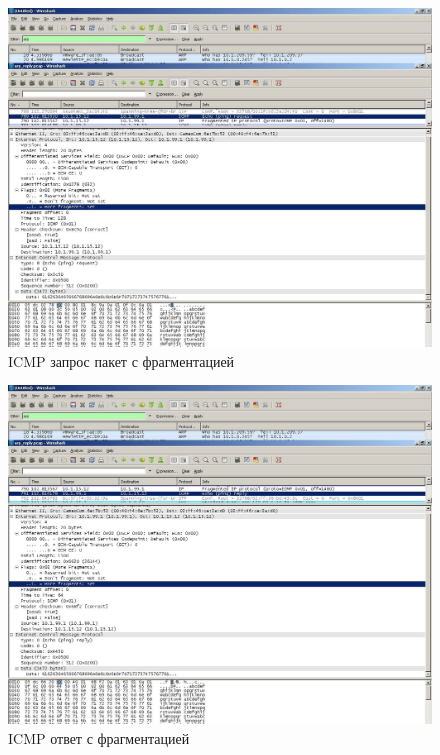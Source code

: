 \documentclass[14pt,a4paper,report]{report}
\begin{document}
\begin{figure}[h!]
	\centering
	\includegraphics[scale = 0.4]{images/icmp_pp_req.JPG}
	\caption{ICMP запрос пакет с фрагментацией}
	\label{image:8}
\end{figure}

\begin{figure}[h!]
	\centering
	\includegraphics[scale = 0.4]{images/icmp_pp_rep.JPG}
	\caption{ICMP ответ с фрагментацией}
	\label{image:8}
\end{figure}



\clearpage
\end{document}
